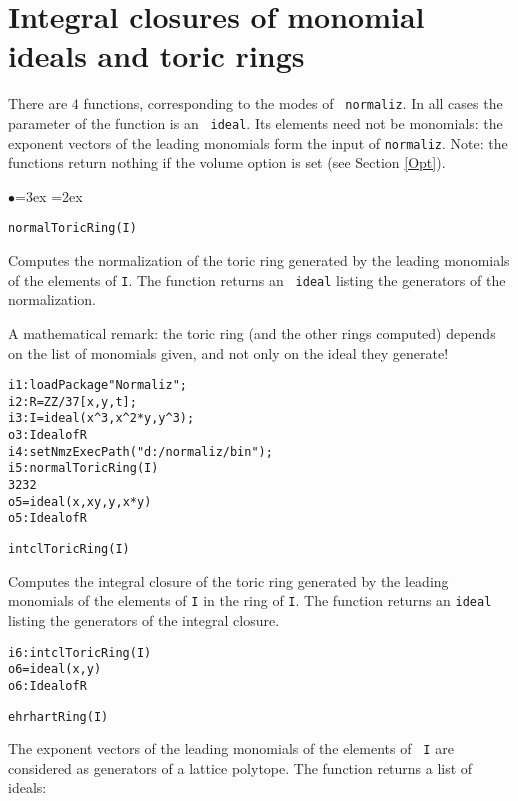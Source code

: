 \documentclass[11pt]{amsart}
\newenvironment{example}
  {\begin{alltt}\small}
  {\end{alltt}}
\newenvironment{functions}
  {\begin{list}{$\bullet$}{\leftmargin=3ex \labelwidth=2ex
  \listparindent=0pt \itemsep=6pt \parsep=3pt}}
  {\end{list}}
\begin{document}
\section{Integral closures of monomial ideals and toric rings}
\label{IntCl}

There are $4$ functions, corresponding to the modes of {\tt
normaliz}. In all cases the parameter of the function is an {\tt
ideal}. Its elements need not be monomials: the exponent vectors
of the leading monomials form the input of {\tt normaliz}. Note: the
functions return nothing if the volume option is set (see
Section \ref{Opt}).

\begin{functions}

\item \verb+normalToricRing(I)+

Computes the normalization of the toric ring generated by the leading
monomials of the elements of {\tt I}. The function returns an {\tt
ideal} listing the generators of the normalization.

A mathematical remark: the toric ring (and the other rings
computed) depends on the list of monomials given, and not only on
the ideal they generate!

\begin{example}
i1 : loadPackage "Normaliz";
i2 : R=ZZ/37[x,y,t];
i3 : I=ideal(x^3,x^2*y,y^3);
o3 : Ideal of R
i4 : setNmzExecPath("d:/normaliz/bin");
i5 : normalToricRing(I)
             3   2    3     2
o5 = ideal (x , x y, y , x*y )
o5 : Ideal of R
\end{example}

\item \verb+intclToricRing(I)+

Computes the integral closure of the toric ring generated by the
leading monomials of the elements of {\tt I} in the ring of {\tt I}.
The function returns an {\tt ideal} listing the generators of the
integral closure.

\begin{example}
i6 : intclToricRing(I)
o6 = ideal (x, y)
o6 : Ideal of R
\end{example}


\item \verb+ehrhartRing(I)+

The exponent vectors of the leading monomials of the elements of {\tt
I} are considered as generators of a lattice polytope. The
function returns a list of ideals:


\end{functions}
\end{document}
